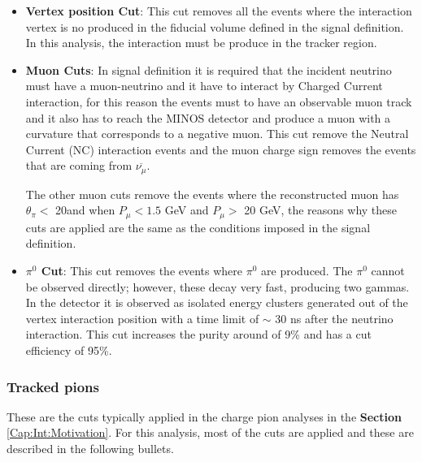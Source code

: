 \begin{itemize}
    \item \textbf{Vertex position Cut}: This cut removes all the events where the interaction vertex is no produced in the fiducial volume defined in the signal definition. In this analysis, the interaction must be produce in the tracker region. 
    \item \textbf{Muon Cuts}: In signal definition it is required that the incident neutrino must have a muon-neutrino and it have to interact by Charged Current interaction, for this reason the events must to have an observable muon track and it also has to reach the MINOS detector and produce a muon with a curvature that corresponds to a negative muon. This cut remove the Neutral Current (NC) interaction events and the muon charge sign removes the events that are coming from $\overline{\nu_\mu}$. 
    
    The other muon cuts remove the events where the reconstructed muon has $\theta_\pi<$ 20\textdegree and when $P_\mu < 1.5$ GeV and $P_\mu>$ 20 GeV, the reasons why these cuts are applied are the same as the conditions imposed in the signal definition.  
    \item \textbf{$\pi^0$ Cut}: This cut removes the events where $\pi^0$ are produced. The $\pi^0$ cannot be observed directly; however, these decay very fast, producing two gammas. In the detector it is observed as isolated energy clusters generated out of the vertex interaction position with a time limit of \(\sim\) 30 ns after the neutrino interaction. This cut increases the purity around of 9\% and has a cut efficiency of 95\%. 
\end{itemize}


\subsubsection{Tracked pions}
\label{Cap:Analysis:DataSelection:Cuts:Tracked}

These are the cuts typically applied in the charge pion analyses in the \textbf{Section} \ref{Cap:Int:Motivation}. For this analysis, most of the cuts are applied and these are described in the following bullets. 

